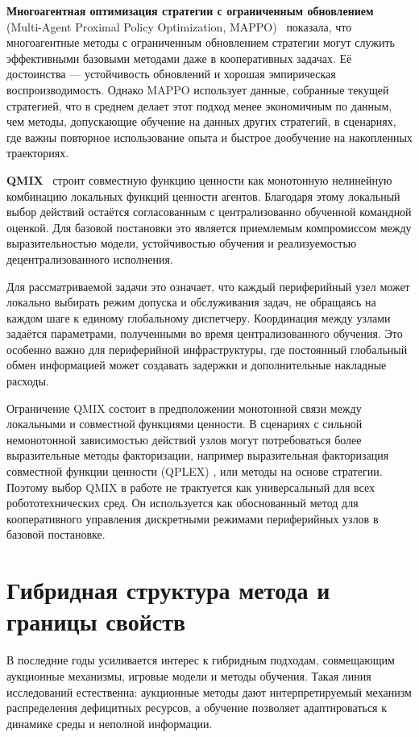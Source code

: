 \textbf{Многоагентная оптимизация стратегии с ограниченным обновлением} (Multi-Agent Proximal Policy Optimization, MAPPO)~\cite{Yu2021MAPPO} показала, что многоагентные методы с ограниченным обновлением стратегии могут служить эффективными базовыми методами даже в кооперативных задачах. Её достоинства --- устойчивость обновлений и хорошая эмпирическая воспроизводимость. Однако MAPPO использует данные, собранные текущей стратегией, что в среднем делает этот подход менее экономичным по данным, чем методы, допускающие обучение на данных других стратегий, в сценариях, где важны повторное использование опыта и быстрое дообучение на накопленных траекториях.

\textbf{QMIX}~\cite{Rashid2018QMIX} строит совместную функцию ценности как монотонную нелинейную комбинацию локальных функций ценности агентов. Благодаря этому локальный выбор действий остаётся согласованным с централизованно обученной командной оценкой. Для базовой постановки это является приемлемым компромиссом между выразительностью модели, устойчивостью обучения и реализуемостью децентрализованного исполнения.

Для рассматриваемой задачи это означает, что каждый периферийный узел может
локально выбирать режим допуска и обслуживания задач, не обращаясь на каждом
шаге к единому глобальному диспетчеру. Координация между узлами задаётся
параметрами, полученными во время централизованного обучения. Это особенно
важно для периферийной инфраструктуры, где постоянный глобальный обмен
информацией может создавать задержки и дополнительные накладные расходы.

Ограничение QMIX состоит в предположении монотонной связи между локальными и совместной функциями ценности. В сценариях с сильной немонотонной зависимостью действий узлов могут потребоваться более выразительные методы факторизации, например выразительная факторизация совместной функции ценности (QPLEX) \cite{Wang2021QPLEX}, или методы на основе стратегии. Поэтому выбор QMIX в работе не трактуется как универсальный для всех робототехнических сред. Он используется как обоснованный метод для кооперативного управления дискретными режимами периферийных узлов в базовой постановке.

\section{Гибридная структура метода и границы свойств}

В последние годы усиливается интерес к гибридным подходам, совмещающим
аукционные механизмы, игровые модели и методы обучения. Такая линия
исследований естественна: аукционные методы дают интерпретируемый механизм
распределения дефицитных ресурсов, а обучение позволяет адаптироваться к
динамике среды и неполной информации.

